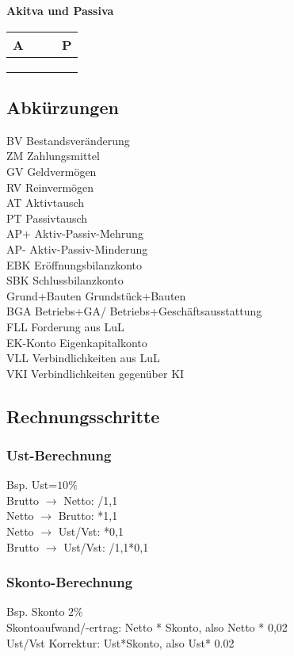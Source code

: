 \documentclass[paper=a4, fontsize=11pt]{scrartcl}
\numberwithin{equation}{section}
\numberwithin{figure}{section}
\numberwithin{table}{section}
\begin{document}
\textbf{Akitva und Passiva}
\begin{tabular}{cc|cc}
A & & & P \\\hline
  & & & \\
  & & & \\\hline
  & & & \\\hline
\end{tabular}

\subsection{Abkürzungen}
BV Bestandsveränderung \\
ZM Zahlungsmittel \\
GV Geldvermögen \\
RV Reinvermögen \\
AT Aktivtausch \\
PT Passivtausch \\
AP+ Aktiv-Passiv-Mehrung \\
AP- Aktiv-Passiv-Minderung \\
EBK Eröffnungsbilanzkonto \\
SBK Schlussbilanzkonto \\
Grund+Bauten Grundstück+Bauten \\
BGA Betriebs+GA/ Betriebs+Geschäftsausstattung \\
FLL Forderung aus LuL \\
EK-Konto Eigenkapitalkonto \\
VLL Verbindlichkeiten aus LuL \\
VKI Verbindlichkeiten gegenüber KI \\

\subsection{Rechnungsschritte}
\subsubsection{Ust-Berechnung}
Bsp. Ust=$10 \%$ \\
Brutto $\rightarrow$ Netto:  /1,1 \\
Netto $\rightarrow$ Brutto:  *1,1 \\
Netto $\rightarrow$ Ust/Vst:  *0,1 \\
Brutto $\rightarrow$ Ust/Vst:  /1,1*0,1 \\

\subsubsection{Skonto-Berechnung}
Bsp. Skonto $2 \%$ \\
Skontoaufwand/-ertrag: Netto * Skonto, also Netto * 0,02 \\
Ust/Vst Korrektur: Ust*Skonto, also Ust* 0.02 \\
\end{document}

